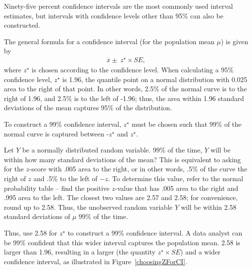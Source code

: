 \begin{spacing}{1.5}

Ninety-five percent confidence intervals are the most commonly used interval estimates, but intervals with confidence levels other than 95\% can also be constructed.

The general formula for a confidence interval (for the population mean $\mu$) is given by 
\begin{align}
	\overline{x} \pm \ z^{\star} \times SE,
\end{align}
where $z^{\star}$ is chosen according to the confidence level. When calculating a 95\% confidence level, $z^{\star}$ is 1.96, the quantile point on a normal distribution with 0.025 area to the right of that point. In other words, 2.5\% of the normal curve is to the right of 1.96, and 2.5\% is to the left of -1.96; thus, the area within 1.96 standard deviations of the mean captures 95\% of the distribution.

To construct a 99\% confidence interval, $z^{\star}$ must be chosen such that 99\% of the normal curve is captured between -$z^{\star}$ and $z^{\star}$.

\begin{example}{Let $Y$ be a normally distributed random variable. 99\% of the time, $Y$ will be within how many standard deviations of the mean?}
	This is equivalent to asking for the $z$-score with .005 area to the right, or in other words, .5\% of the curve the right of $z$ and .5\% to the left of $-z$. To determine this value, refer to the normal probability table -- find the positive $z$-value that has .005 area to the right and .995 area to the left. The closest two values are 2.57 and 2.58; for convenience, round up to 2.58. Thus, the unobserved random variable $Y$ will be within 2.58 standard deviations of $\mu$ 99\% of the time.
\end{example}

Thus, use 2.58 for $z^{\star}$ to construct a 99\% confidence interval. A data analyst can be 99\% confident that this wider interval captures the population mean. 2.58 is larger than 1.96, resulting in a larger  (the quantity $z^{\star} \times SE$) and a wider confidence interval, as illustrated in Figure~\ref{choosingZForCI}.


\end{spacing}
